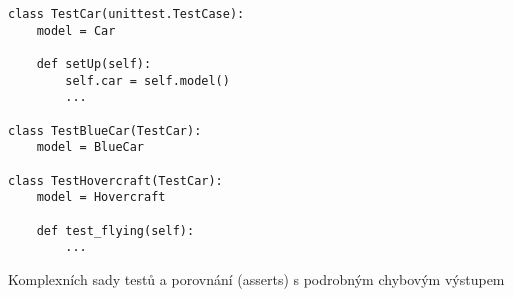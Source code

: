 \begin{frame}[fragile]
\begin{verbatim}
class TestCar(unittest.TestCase):
    model = Car

    def setUp(self):
        self.car = self.model()
        ...

class TestBlueCar(TestCar):
    model = BlueCar

class TestHovercraft(TestCar):
    model = Hovercraft

    def test_flying(self):
        ...

\end{verbatim}
\end{frame}

\begin{frame}
\begin{block}{}
    Komplexních sady testů a porovnání (asserts) s podrobným chybovým výstupem
\end{block}
\end{frame}